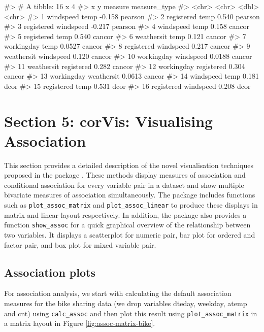 \begin{Schunk}
\begin{Soutput}
#> # A tibble: 16 x 4
#>    x          y          measure measure_type
#>    <chr>      <chr>        <dbl> <chr>       
#>  1 windspeed  temp       -0.158  pearson     
#>  2 registered temp        0.540  pearson     
#>  3 registered windspeed  -0.217  pearson     
#>  4 windspeed  temp        0.158  cancor      
#>  5 registered temp        0.540  cancor      
#>  6 weathersit temp        0.121  cancor      
#>  7 workingday temp        0.0527 cancor      
#>  8 registered windspeed   0.217  cancor      
#>  9 weathersit windspeed   0.120  cancor      
#> 10 workingday windspeed   0.0188 cancor      
#> 11 weathersit registered  0.282  cancor      
#> 12 workingday registered  0.304  cancor      
#> 13 workingday weathersit  0.0613 cancor      
#> 14 windspeed  temp        0.181  dcor        
#> 15 registered temp        0.531  dcor        
#> 16 registered windspeed   0.208  dcor
\end{Soutput}
\end{Schunk}

\hypertarget{section-5-corvis-visualising-association}{%
\section{Section 5: corVis: Visualising
Association}\label{section-5-corvis-visualising-association}}

This section provides a detailed description of the novel visualisation
techniques proposed in the package . These methods
display measures of association and conditional association for every
variable pair in a dataset and show multiple bivariate measures of
association simultaneously. The package includes functions such as
\texttt{plot\_assoc\_matrix} and \texttt{plot\_assoc\_linear} to produce
these displays in matrix and linear layout respectively. In addition,
the package also provides a function \texttt{show\_assoc} for a quick
graphical overview of the relationship between two variables. It
displays a scatterplot for numeric pair, bar plot for ordered and factor
pair, and box plot for mixed variable pair.

\hypertarget{association-plots}{%
\subsection{Association plots}\label{association-plots}}

For association analysis, we start with calculating the default
association measures for the bike sharing data (we drop variables
dteday, weekday, atemp and cnt) using \texttt{calc\_assoc} and then plot
this result using \texttt{plot\_assoc\_matrix} in a matrix layout in
Figure \ref{fig:assoc-matrix-bike}.

